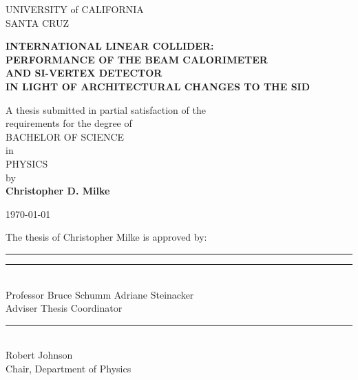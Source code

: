 \documentclass{report}
\begin{document}
	\begin{titlepage} \begin{singlespace}
        \begin{center} \begin{noindent} \begin{large}
            UNIVERSITY of CALIFORNIA \\ SANTA CRUZ

            \vspace{\baselineskip}

            \textbf{INTERNATIONAL LINEAR COLLIDER: \\
                PERFORMANCE OF THE BEAM CALORIMETER \\ 
                AND SI-VERTEX DETECTOR \\
                IN LIGHT OF ARCHITECTURAL CHANGES TO THE SID}

            \vspace{\baselineskip}
            A thesis submitted in partial satisfaction of the \\ requirements for the degree of \\
            \vspace{\baselineskip}
            BACHELOR OF SCIENCE \\
            \vspace{\baselineskip}
            in \\
            \vspace{\baselineskip}
            PHYSICS \\
            \vspace{\baselineskip}
            by \\
            \vspace{\baselineskip}
            \textbf{Christopher D. Milke} \\
            \vspace{\baselineskip}

            \today \\
            \vspace*{\fill}

            The thesis of Christopher Milke is approved by: \\
            \end{large}
            \vspace{1.5cm}
            \rule{70mm}{.5pt} \hfill \rule{70mm}{.5pt} \\
            Professor Bruce Schumm \hfill Adriane Steinacker \\
            Adviser \hfill Thesis Coordinator \\
            \vspace{1.5cm}
            \rule{70mm}{.5pt} \\
            Robert Johnson \\
            Chair, Department of Physics \\
        \end{noindent} \end{center}

	\end{singlespace} \end{titlepage}
\end{document}

